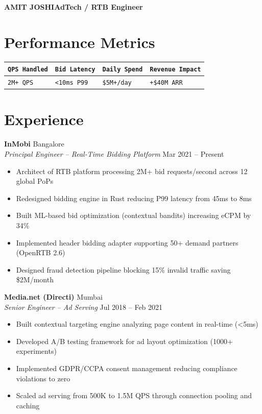 \documentclass[10pt,letterpaper]{article}
\begin{document}
\noindent\colorbox{adblue}{\parbox{\dimexpr\linewidth-2\fboxsep}{%
\color{white}\bfseries\large\vspace{3pt}\hspace{6pt}AMIT JOSHI\hfill{\normalsize AdTech / RTB Engineer}\hspace{6pt}\vspace{3pt}}}

\vspace{6pt}

\section{Performance Metrics}
\noindent\begin{tabularx}{\linewidth}{@{}|X|X|X|X|@{}}
\hline
\rowcolor{lightblue}
\textbf{\texttt{QPS Handled}} & \textbf{\texttt{Bid Latency}} & \textbf{\texttt{Daily Spend}} & \textbf{\texttt{Revenue Impact}}\\
\hline
\texttt{2M+ QPS} & \texttt{<10ms P99} & \texttt{\$5M+/day} & \texttt{+\$40M ARR}\\
\hline
\end{tabularx}

\section{Experience}

\textbf{InMobi} \hfill Bangalore\\
\textit{Principal Engineer -- Real-Time Bidding Platform} \hfill Mar 2021 -- Present
\begin{itemize}
\item Architect of RTB platform processing 2M+ bid requests/second across 12 global PoPs
\item Redesigned bidding engine in Rust reducing P99 latency from 45ms to 8ms
\item Built ML-based bid optimization (contextual bandits) increasing eCPM by 34\%
\item Implemented header bidding adapter supporting 50+ demand partners (OpenRTB 2.6)
\item Designed fraud detection pipeline blocking 15\% invalid traffic saving \$2M/month
\end{itemize}

\textbf{Media.net (Directi)} \hfill Mumbai\\
\textit{Senior Engineer -- Ad Serving} \hfill Jul 2018 -- Feb 2021
\begin{itemize}
\item Built contextual targeting engine analyzing page content in real-time (<5ms)
\item Developed A/B testing framework for ad layout optimization (1000+ experiments)
\item Implemented GDPR/CCPA consent management reducing compliance violations to zero
\item Scaled ad serving from 500K to 1.5M QPS through connection pooling and caching
\end{itemize}
\end{document}
